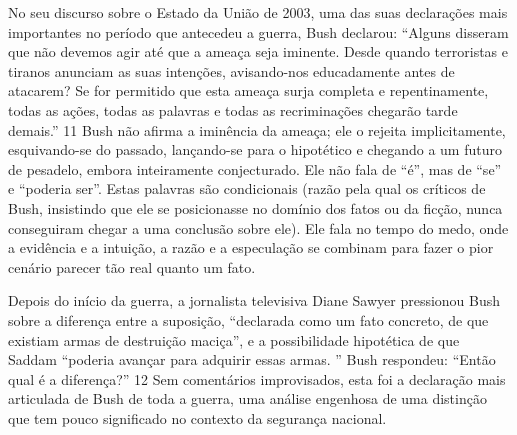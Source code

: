 No seu discurso sobre o Estado da União de 2003, uma das suas declarações mais importantes no período que antecedeu a guerra, Bush declarou: “Alguns disseram que não devemos agir até que a ameaça seja iminente. Desde quando terroristas e tiranos anunciam as suas intenções, avisando-nos educadamente antes de atacarem? Se for permitido que esta ameaça surja completa e repentinamente, todas as ações, todas as palavras e todas as recriminações chegarão tarde demais.”
 {\color{blue} 11}  
Bush não afirma a iminência da ameaça; ele o rejeita implicitamente, esquivando-se do passado, lançando-se para o hipotético e chegando a um futuro de pesadelo, embora inteiramente conjecturado. Ele não fala de “é”, mas de “se” e “poderia ser”. Estas palavras são condicionais (razão pela qual os críticos de Bush, insistindo que ele se posicionasse no domínio dos fatos ou da ficção, nunca conseguiram chegar a uma conclusão sobre ele). Ele fala no tempo do medo, onde a evidência e a intuição, a razão e a especulação se combinam para fazer o pior cenário parecer tão real quanto um fato.
 
\par
 
Depois do início da guerra, a jornalista televisiva Diane Sawyer pressionou Bush sobre a diferença entre a suposição, “declarada como um fato concreto, de que existiam armas de destruição maciça”, e a possibilidade hipotética de que Saddam “poderia avançar para adquirir essas armas. ” Bush respondeu: “Então qual é a diferença?”
 {\color{blue} 12}  
Sem comentários improvisados, esta foi a declaração mais articulada de Bush de toda a guerra, uma análise engenhosa de uma distinção que tem pouco significado no contexto da segurança nacional.
 
\par
 
